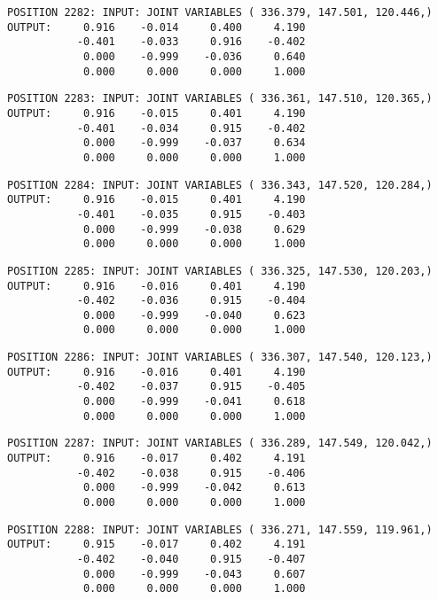 \begin{verbatim}
POSITION 2282: INPUT: JOINT VARIABLES ( 336.379, 147.501, 120.446,)
OUTPUT:     0.916    -0.014     0.400     4.190
           -0.401    -0.033     0.916    -0.402
            0.000    -0.999    -0.036     0.640
            0.000     0.000     0.000     1.000
\end{verbatim} \pagebreak[1]\begin{verbatim}
POSITION 2283: INPUT: JOINT VARIABLES ( 336.361, 147.510, 120.365,)
OUTPUT:     0.916    -0.015     0.401     4.190
           -0.401    -0.034     0.915    -0.402
            0.000    -0.999    -0.037     0.634
            0.000     0.000     0.000     1.000
\end{verbatim} \pagebreak[1]\begin{verbatim}
POSITION 2284: INPUT: JOINT VARIABLES ( 336.343, 147.520, 120.284,)
OUTPUT:     0.916    -0.015     0.401     4.190
           -0.401    -0.035     0.915    -0.403
            0.000    -0.999    -0.038     0.629
            0.000     0.000     0.000     1.000
\end{verbatim} \pagebreak[1]\begin{verbatim}
POSITION 2285: INPUT: JOINT VARIABLES ( 336.325, 147.530, 120.203,)
OUTPUT:     0.916    -0.016     0.401     4.190
           -0.402    -0.036     0.915    -0.404
            0.000    -0.999    -0.040     0.623
            0.000     0.000     0.000     1.000
\end{verbatim} \pagebreak[1]\begin{verbatim}
POSITION 2286: INPUT: JOINT VARIABLES ( 336.307, 147.540, 120.123,)
OUTPUT:     0.916    -0.016     0.401     4.190
           -0.402    -0.037     0.915    -0.405
            0.000    -0.999    -0.041     0.618
            0.000     0.000     0.000     1.000
\end{verbatim} \pagebreak[1]\begin{verbatim}
POSITION 2287: INPUT: JOINT VARIABLES ( 336.289, 147.549, 120.042,)
OUTPUT:     0.916    -0.017     0.402     4.191
           -0.402    -0.038     0.915    -0.406
            0.000    -0.999    -0.042     0.613
            0.000     0.000     0.000     1.000
\end{verbatim} \pagebreak[1]\begin{verbatim}
POSITION 2288: INPUT: JOINT VARIABLES ( 336.271, 147.559, 119.961,)
OUTPUT:     0.915    -0.017     0.402     4.191
           -0.402    -0.040     0.915    -0.407
            0.000    -0.999    -0.043     0.607
            0.000     0.000     0.000     1.000
\end{verbatim} \pagebreak[1]\begin{verbatim}

\end{verbatim}
